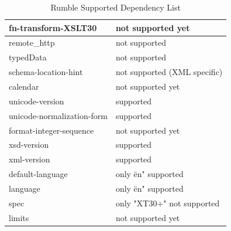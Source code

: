\begin{table}
\begin{tabular}{|l|l|}
		\hline
		fn-transform-XSLT30                & not supported yet             \\ 
		\hline
		remote\_http                       & not supported                 \\ 
		\hline
		typedData                          & not supported                 \\ 
		\hline
		schema-location-hint               & not supported (XML specific)  \\ 
		\hline
		calendar                           & not supported yet             \\ 
		\hline
		unicode-version                    & supported                     \\ 
		\hline
		unicode-normalization-form         & supported                     \\ 
		\hline
		format-integer-sequence            & not supported yet             \\ 
		\hline
		xsd-version                        & supported                     \\ 
		\hline
		xml-version                        & supported                     \\ 
		\hline
		default-language                   & only ën" supported            \\ 
		\hline
		language                           & only ën" supported            \\ 
		\hline
		spec                               & only "XT30+" not supported    \\ 
		\hline
		limits                             & not supported yet             \\
		\hline
	\end{tabular}
	\caption{Rumble Supported Dependency List}
	\label{tab:Phase2_DependencyList}
\end{table}